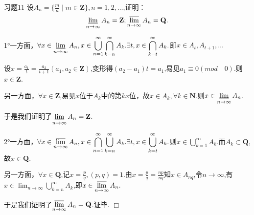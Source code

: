 \documentclass[11pt, a4paper, twoside]{ctexbook}
\newenvironment{proof2}{{\noindent\heiti 证明}}{\hfill $\Box $\par}
\begin{document}
	\begin{myproposition}{习题11}{}
		设$A_{n}=\{\displaystyle\frac{m}{n}\mid m\in \mathbf{Z}\},n=1,2,…$,证明：
        $$\varliminf_{n \to \infty}A_{n}=\mathbf{Z};\varlimsup_{n \to \infty}A_{n}=\mathbf{Q}.$$
	\end{myproposition}
    \begin{proof2}
		1°一方面，$\forall x \in \displaystyle\varliminf_{n \to \infty}A_{n},x \in \displaystyle\bigcup_{n=1}^{\infty}\bigcap_{k=n}^{\infty}A_{k}.\exists t,x\in \displaystyle\bigcap_{k=t}^{\infty}A_{k}.$即$x\in A_{t},A_{t+1},…$


		设$x=\displaystyle\frac{a_{1}}{t}=\displaystyle\frac{a_{2}}{t+1}(a_{1},a_{2}\in \mathbf{Z})$,变形得$(a_{2}-a_{1})t=a_{1}$,易见$a_{1}\equiv 0(mod\quad0)$.则$x\in \mathbf{Z}$.


		另一方面，$\forall x \in \mathbf{Z}$,易见$x$位于$A_{k}$中的第$kx$位，故$x\in A_{k},\forall k \in \mathbf{N}$.则$x\in \displaystyle\varliminf_{n \to \infty}A_{n}.$


		于是我们证明了$\displaystyle\varliminf_{n \to \infty}A_{n}=\mathbf{Z}$.


		2°一方面，$\forall x \in \displaystyle\varlimsup_{n \to \infty}A_{n},x \in \displaystyle\bigcap_{n=1}^{\infty}\bigcup_{k=n}^{\infty}A_{k}.\exists t,x\in \displaystyle\bigcup_{k=t}^{\infty}A_{k}.$则$x \in \displaystyle\bigcup_{k=1}^{\infty}A_{k}.$而$A_{k}\subset \mathbf{Q}$,故$x\in \mathbf{Q}$.


		另一方面，$\forall x \in \mathbf{Q}$,记$x=\displaystyle\frac{p}{q},(p,q)=1$.由$x=\displaystyle\frac{p}{q}=\displaystyle\frac{np}{nq}$知$x\in A_{nq}$,令$n \to \infty$,有$x \in \displaystyle\lim_{n\to \infty}\displaystyle\bigcup_{k=n}^{\infty}A_{k}$,即$x\in \displaystyle\varlimsup_{n \to \infty}A_{n}.$
		
		
		于是我们证明了$\displaystyle\varlimsup_{n \to \infty}A_{n}=\mathbf{Q}$.证毕.		
	\end{proof2}
\end{document}
